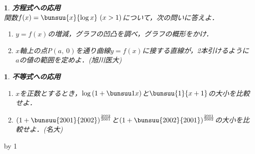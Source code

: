 \documentclass[10pt,
a4paper,
fleqn,
dvipdfmx,
uplatex
]{jsarticle}
\newtheorem{question}[Question]{}
\newcommand{\bqu}{\begin{question}}
\newcommand{\equ}{\end{question}\vfill}
\newcommand{\eQ}{\end{Q}}
\newcommand{\equu}{\end{leftbar}}
\newcommand{\benu}{\begin{enumerate}}
\newcommand{\eenu}{\end{enumerate}}
\newcommand{\bb}{\bf\boldmath}%
\newcommand{\barabara}{%
\myfor{1} %
\newpage   
\setcounter{subsection}{0}
\setcounter{Question}{0}
\renewcommand{\bqu}{\begin{question}}
\renewcommand{\equ}{\end{question}\newpage}
\renewcommand{\eQ}{\end{Q}\newpage}
\renewcommand{\equu}{\end{quuestion}\newpage}
\renewcommand{\equu}{\end{quuestion}\newpage}

\newpage
\setcounter{subsection}{0}
\setcounter{Question}{0}
\myfor{1} %
}
\begin{document}
{\bqu{\bb 方程式への応用}\\
関数$f(x)=\bunsuu{x}{\log x}\ (x >1)$について，次の問いに答えよ．
\benu
\item $y=f(x)$の増減，グラフの凹凸を調べ，グラフの概形をかけ．
\item $x$軸上の点P$(a,\ 0)$を通り曲線$y=f(x)$に接する直線が，2本引けるように$a$の値の範囲を定めよ．\hfill(旭川医大)
\eenu
\equ

\bqu{\bb 不等式への応用}
\benu
\item $x$を正数とするとき，$\log\left(1+\bunsuu 1x\right)$と$\bunsuu{1}{x+1}$の大小を比較せよ．
\item $\left(1+\bunsuu{2001}{2002}\right)^{\frac{2002}{2001}}$と$\left(1+\bunsuu{2002}{2001}\right)^{\frac{2001}{2002}}$の大小を比較せよ．\hfill(名大)
\eenu
\equ

\advance\K by 1\repeat }

\barabara
                                                                                  
\end{document}
